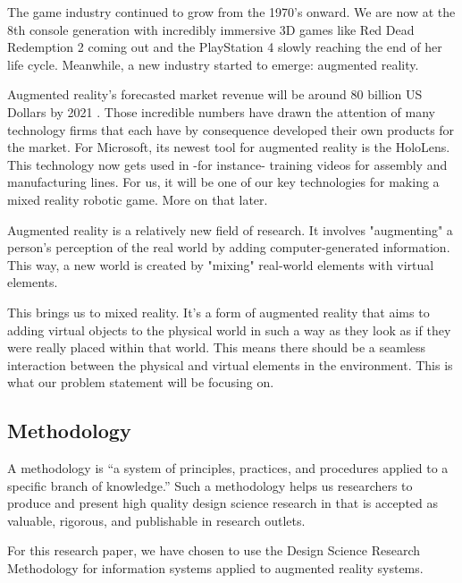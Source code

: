 \documentclass{article}
\begin{document}
The game industry continued to grow from the 1970's onward. We are now at the 8th console generation with incredibly immersive 3D games like Red Dead Redemption 2 coming out and the PlayStation 4 slowly reaching the end of her life cycle. Meanwhile, a new industry started to emerge: augmented reality.

Augmented reality’s forecasted market revenue will be around 80 billion US Dollars by 2021 \cite{evans2017evaluating}. Those incredible numbers have drawn the attention of many technology firms that each have by consequence developed their own products for the market. For Microsoft, its newest tool for augmented reality is the HoloLens. This technology now gets used in -for instance- training videos for assembly and manufacturing lines. For us, it will be one of our key technologies for making a mixed reality robotic game. More on that later.

Augmented reality is a relatively new field of research. It involves "augmenting" a person's perception of the real world by adding computer-generated information. This way, a new world is created by "mixing" real-world elements with virtual elements.

This brings us to mixed reality. It's a form of augmented reality that aims to adding virtual objects to the physical world in such a way as they look as if they were really placed within that world. This means there should be a seamless interaction between the physical and virtual elements in the environment. This is what our problem statement will be focusing on.

\subsection{Methodology}
A methodology is “a system of principles, practices, and procedures applied to a specific
branch of knowledge.” Such a methodology helps us researchers to produce and
present high quality design science research in that is accepted as valuable, rigorous, and
publishable in research outlets.

For this research paper, we have chosen to use the Design Science Research Methodology for information systems applied to augmented reality systems\cite{peffers2007design}\relax.
\end{document}
